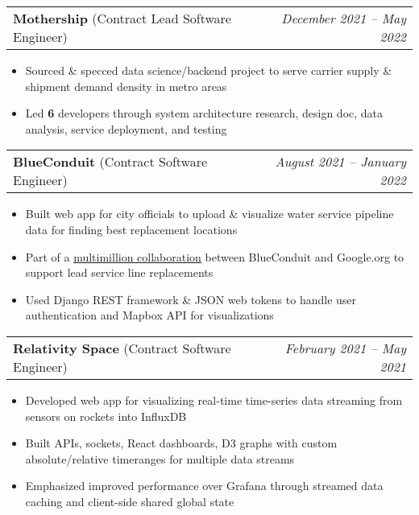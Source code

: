 \documentclass[letterpaper,11pt]{article}
\makeatletter
\newcommand{\resumeItem}[1]{
  \item\small{
    {#1 \vspace{-4pt}}
  }
}
\newcommand{\resumeSubheading}[4]{
  \vspace{-2pt}\item
    \begin{tabular*}{0.97\textwidth}[t]{l@{\extracolsep{\fill}}r}
      \textbf{#1} & #2 \\
      \textit{\small#3} & \textit{\small #4} \\
    \end{tabular*}\vspace{-8pt}
}
\newcommand{\resumeProjectHeading}[2]{
    \item
    \begin{tabular*}{0.97\textwidth}{l@{\extracolsep{\fill}}r}
      \small#1 & \emph{#2} \\
    \end{tabular*}\vspace{-8pt}
}
\newcommand{\resumeItemListStart}{\begin{itemize}[leftmargin=0.2in]}
\newcommand{\resumeItemListEnd}{\end{itemize}\vspace{-5pt}}
\makeatother
\begin{document}
    \resumeProjectHeading
    {\textbf{Mothership} (Contract Lead Software Engineer)}{December 2021 – May 2022}
    \resumeItemListStart
        \resumeItem{Sourced \& specced data science/backend project to serve carrier supply \& shipment demand density in metro areas}
        \resumeItem{Led \textbf{6} developers through system architecture research, design doc, data analysis, service deployment, and testing}
    \resumeItemListEnd


    \resumeProjectHeading
    {\textbf{BlueConduit} (Contract Software Engineer)}{August 2021 – January 2022}
    \resumeItemListStart
        \resumeItem{Built web app for city officials to upload \& visualize water service pipeline data for finding best replacement locations}
        \resumeItem{Part of a \href{https://www.nrdc.org/press-releases/blueconduit-and-googleorg-announce-coalition-help-communities-quantify-and-locate}{\underline{multimillion collaboration}} between BlueConduit and Google.org to support lead service line replacements}
        \resumeItem{Used Django REST framework \& JSON web tokens to handle user authentication and Mapbox API for visualizations}
    \resumeItemListEnd

    \resumeProjectHeading
    {\textbf{Relativity Space} (Contract Software Engineer)}{February 2021 – May 2021}
        \resumeItemListStart
            \resumeItem{Developed web app for visualizing real-time time-series data streaming from sensors on rockets into InfluxDB}
            \resumeItem{Built APIs, sockets, React dashboards, D3 graphs with custom absolute/relative timeranges for multiple data streams}
            \resumeItem{Emphasized improved performance over Grafana through streamed data caching and client-side shared global state}
        \resumeItemListEnd
\end{document}
